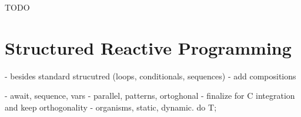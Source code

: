 \documentclass{acm_proc_article-sp}
\newcommand{\1}{\;}
\newcommand{\2}{\;\;}
\newcommand{\3}{\;\;\;}
\newcommand{\5}{\;\;\;\;\;}
\begin{document}
TODO

\section{Structured Reactive Programming}
\label{sec.ceu}

- besides standard strucutred (loops, conditionals, sequences)
- add compositions

- await, sequence, vars
- parallel, patterns, ortoghonal
- finalize for C integration and keep orthogonality
- organisms, static, dynamic. do T;
\end{document}
